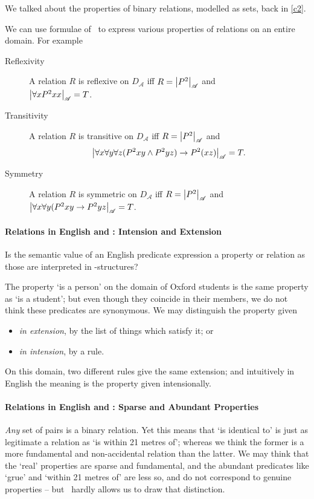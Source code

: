 We talked about the properties of binary relations, modelled as sets, back in \autoref{c2}.

 We can use formulae of \ltwo\ to express various properties of relations on an entire domain. For example \begin{description}
 	\item [Reflexivity] A relation $R$ is reflexive on $D_{\mathscr{A}}$ iff $R = \left|P^{2}\right|_{\mathscr{A}}$ and\\ $\left|\forall x P^{2}xx\right|_{\mathscr{A}}=T$. 
\item [Transitivity] A relation $R$ is transitive on $D_{\mathscr{A}}$ iff $R = \left|P^{2}\right|_{\mathscr{A}}$ and $$\left|\forall x \forall y \forall z (P^{2}xy \wedge P^{2}yz) \to P^{2}(xz)\right|_{\mathscr{A}}=T.$$ 
\item [Symmetry] A relation $R$ is symmetric on $D_{\mathscr{A}}$ iff $R = \left|P^{2}\right|_{\mathscr{A}}$ and\\ $\left|\forall x \forall y  (P^{2}xy \to P^{2}yz\right|_{\mathscr{A}}=T$. 
 \end{description}

\paragraph{Relations in English and \ltwo: Intension and Extension}

Is the semantic value of an English predicate expression a property or relation as those are interpreted in \ltwo-structures?

The property `is a person' on the domain of Oxford students is the same property as `is a student'; but even though they coincide in their members, we do not think these predicates are synonymous. We may distinguish the property given \begin{itemize}\item \emph{in extension}, by the list of things which satisfy it; or \item \emph{in intension}, by a rule.\end{itemize} On this domain, two different rules give the same extension; and intuitively in English the meaning is the property given intensionally.

\paragraph{Relations in English and \ltwo: Sparse and Abundant Properties}


 \emph{Any} set of pairs is a binary relation. Yet this means that `is identical to' is just as legitimate a relation as `is within 21 metres of'; whereas we think the former is a more fundamental and non-accidental relation than the latter. We may think that the `real' properties are sparse and fundamental, and the abundant predicates like `grue' and `within 21 metres of' are less so, and do not correspond to genuine properties – but \ltwo\ hardly allows us to draw that distinction.

